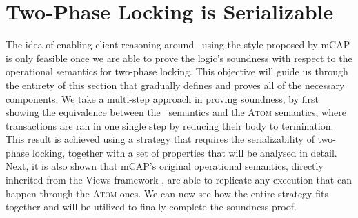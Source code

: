 \chapter{Two-Phase Locking is Serializable}

The idea of enabling client reasoning around \tpl\ using the style proposed by mCAP is only feasible once we are able to prove the logic's soundness with respect to the operational semantics for two-phase locking. This objective will guide us through the entirety of this section that gradually defines and proves all of the necessary components. We take a multi-step approach in proving soundness, by first showing the equivalence between the \tpl\ semantics and the \textsc{Atom} semantics, where transactions are ran in one single step by reducing their body to termination. This result is achieved using a strategy that requires the serializability of two-phase locking, together with a set of properties that will be analysed in detail. Next, it is also shown that mCAP's original operational semantics, directly inherited from the Views framework \cite{views}, are able to replicate any execution that can happen through the \textsc{Atom} ones. We can now see how the entire strategy fits together and will be utilized to finally complete the soundness proof.



